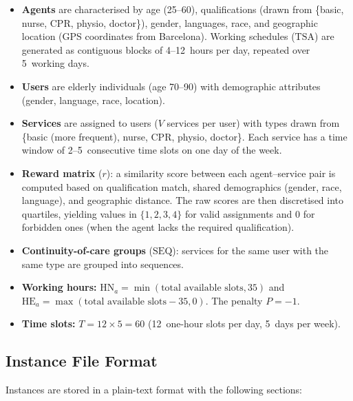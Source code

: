 \documentclass[11pt,a4paper]{article}
\newcommand{\SEQ}{\mathrm{SEQ}}
\newcommand{\TSA}{\mathrm{TSA}}
\newcommand{\HN}{\mathrm{HN}}
\newcommand{\HE}{\mathrm{HE}}
\begin{document}
\begin{itemize}
    \item \textbf{Agents} are characterised by age (25--60), qualifications
          (drawn from \{basic, nurse, CPR, physio, doctor\}), gender, languages,
          race, and geographic location (GPS coordinates from Barcelona).
          Working schedules ($\TSA$) are generated as contiguous blocks of
          4--12~hours per day, repeated over 5~working days.

    \item \textbf{Users} are elderly individuals (age 70--90) with demographic
          attributes (gender, language, race, location).

    \item \textbf{Services} are assigned to users ($V$ services per user) with
          types drawn from \{basic (more frequent), nurse, CPR, physio, doctor\}.
          Each service has a time window of 2--5~consecutive time slots on one
          day of the week.

    \item \textbf{Reward matrix} ($r$): a similarity score between each
          agent--service pair is computed based on qualification match, shared
          demographics (gender, race, language), and geographic distance.
          The raw scores are then discretised into quartiles, yielding values in
          $\{1, 2, 3, 4\}$ for valid assignments and $0$ for forbidden ones
          (when the agent lacks the required qualification).

    \item \textbf{Continuity-of-care groups} ($\SEQ$): services for the same user
          with the same type are grouped into sequences.

    \item \textbf{Working hours:} $\HN_a = \min(\text{total available slots}, 35)$
          and $\HE_a = \max(\text{total available slots} - 35, 0)$.
          The penalty $P = -1$.

    \item \textbf{Time slots:} $T = 12 \times 5 = 60$ (12~one-hour slots per day,
          5~days per week).
\end{itemize}

\subsection{Instance File Format}

Instances are stored in a plain-text format with the following sections:
\end{document}
